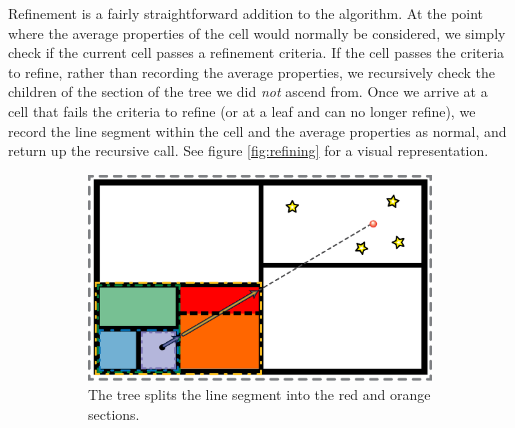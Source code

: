 Refinement is a fairly straightforward addition to the algorithm. At the point where the average properties of the cell would normally be considered, we simply check if the current cell passes a refinement criteria. If the cell passes the criteria to refine, rather than recording the average properties, we recursively check the children of the section of the tree we did \emph{not} ascend from. Once we arrive at a cell that fails the criteria to refine (or at a leaf and can no longer refine), we record the line segment within the cell and the average properties as normal, and return up the recursive call. See figure \ref{fig:refining} for a visual representation.

\begin{figure}
        \centering
        \begin{subfigure}[h]{0.45\textwidth}
                \includegraphics[width=\textwidth]{graphics/refinement.eps}
                \caption{The tree splits the line segment into the red and orange sections.}
                \label{fig:refinetree}
        \end{subfigure}
        ~ 
        \begin{subfigure}[h]{0.45\textwidth}

\end{subfigure}
\end{figure}
